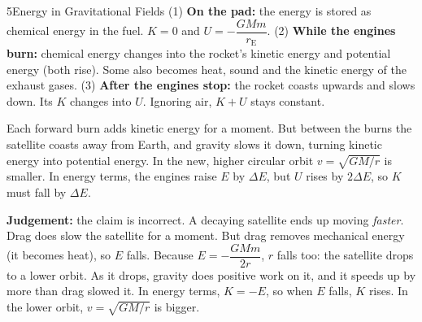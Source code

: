 \begin{chapteranswers}{5}{Energy in Gravitational Fields}
        (1) \textbf{On the pad:} the energy is stored as chemical energy in the
        fuel. $K = 0$ and $U = -\dfrac{GMm}{r_\mathrm{E}}$.
        (2) \textbf{While the engines burn:} chemical energy changes into the
        rocket's kinetic energy and potential energy (both rise). Some also
        becomes heat, sound and the kinetic energy of the exhaust gases.
        (3) \textbf{After the engines stop:} the rocket coasts upwards and slows
        down. Its $K$ changes into $U$. Ignoring air, $K + U$ stays constant.
        \begin{markingcriteria}
        \end{markingcriteria}
  \item Each forward burn adds kinetic energy for a moment. But between the burns
        the satellite coasts away from Earth, and gravity slows it down, turning
        kinetic energy into potential energy. In the new, higher circular orbit
        $v = \sqrt{GM/r}$ is smaller. In energy terms, the engines raise $E$ by
        $\Delta E$, but $U$ rises by $2\Delta E$, so $K$ must fall by $\Delta E$.
        \begin{markingcriteria}
        \end{markingcriteria}
  \item \textbf{Judgement:} the claim is incorrect. A decaying satellite ends up
        moving \emph{faster}.
        Drag does slow the satellite for a moment. But drag removes mechanical
        energy (it becomes heat), so $E$ falls. Because $E = -\dfrac{GMm}{2r}$,
        $r$ falls too: the satellite drops to a lower orbit. As it drops, gravity
        does positive work on it, and it speeds up by more than drag slowed it.
        In energy terms, $K = -E$, so when $E$ falls, $K$ rises. In the lower
        orbit, $v = \sqrt{GM/r}$ is bigger.
        \begin{markingcriteria}
        \end{markingcriteria}
\end{chapteranswers}
